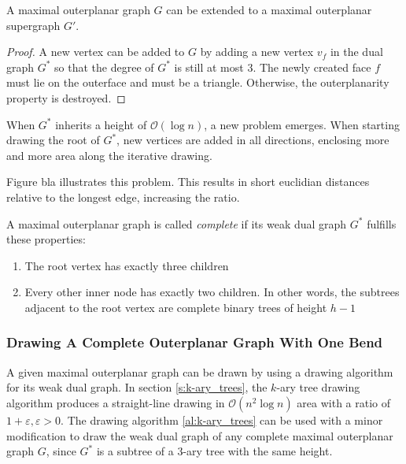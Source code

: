 \begin{observation}
\end{observation}

\begin{lemma}
	A maximal outerplanar graph $G$ can be extended to a maximal outerplanar supergraph $G'$.\label{l:outerplanar-supergraph}
\end{lemma}
\begin{proof}
	A new vertex can be added to $G$ by adding a new vertex $v_f$ in the dual graph $G^*$ so that the degree of $G^*$ is still at most 3. The newly created face $f$ must lie on the outerface and must be a triangle. Otherwise, the outerplanarity property is destroyed.
\end{proof}

When $G^*$ inherits a height of $\mathcal{O}(\log n)$, a new problem emerges. When starting drawing the root of $G^*$, new vertices are added in all directions, enclosing more and more area along the iterative drawing. 

Figure bla illustrates this problem. 
This results in short euclidian distances relative to the longest edge, increasing the ratio.\\
\begin{definition}
	A maximal outerplanar graph is called \emph{complete} if its weak dual graph $G^*$ fulfills these properties:
\begin{enumerate}
	\item The root vertex has exactly three children
	\item Every other inner node has exactly two children. In other words, the subtrees adjacent to the root vertex are complete binary trees of height $h-1$
\end{enumerate}
\end{definition}

\subsubsection{Drawing A Complete Outerplanar Graph With One Bend}

A given maximal outerplanar graph can be drawn by using a drawing algorithm for its weak dual graph. In section \ref{s:k-ary_trees}, the $k$-ary tree drawing algorithm produces a straight-line drawing in $\mathcal{O}(n^2 \log n)$ area with a ratio of $1+\varepsilon,\varepsilon>0$. The drawing algorithm \ref{al:k-ary_trees} can be used with a minor modification to draw the weak dual graph of any complete maximal outerplanar graph $G$, since $G^*$ is a subtree of a $3$-ary tree with the same height.\\

